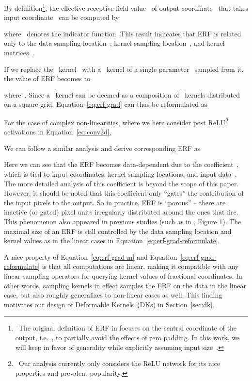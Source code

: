 \documentclass{article} \usepackage{iclr2020_conference, times}
\begin{document}
By definition\footnote{\
    The original definition of ERF in
    \cite{luo2016understanding} focuses on the central coordinate of the output,
    i.e.~, to partially avoid the effects of zero padding.
    In this work, we will keep  in favor of generality while explicitly
    assuming input size~.
}, the effective receptive field value~ of output coordinate~ that
takes input coordinate~ can be computed by

where~ denotes the indicator function. This result indicates
that ERF is related only to the data sampling location~, kernel sampling
location~, and kernel matrices~.

If we replace the~ kernel~ with a~
kernel of a single parameter~ sampled from it, the
value of ERF becomes to

where~. Since a~ kernel can be deemed
as a composition of~  kernels distributed on a square
grid, Equation~\ref{eq:erf-grad} can thus be reformulated as

For the case of complex non-linearities, where we here consider post ReLU\footnote{\
    Our analysis currently only considers the ReLU network for its
    nice properties and prevalent popularity.
} activations in
Equation~\ref{eq:conv2d},

We can follow a similar analysis and derive corresponding ERF as

Here we can see that the ERF becomes data-dependent due to the coefficient~,
which is tied to input coordinates, kernel sampling locations, and input
data~.
The more detailed analysis of this coefficient is beyond the scope of
this paper.
However, it should be noted that this coefficient only ``gates'' the
contribution of the input pixels to the output.
So in practice, ERF is ``porous'' -- there are inactive (or gated) pixel units
irregularly distributed around the ones that fire.
This phenomenon also appeared in previous studies (such as in
\citet{luo2016understanding}, Figure 1).
The maximal size of an ERF is still controlled by the data sampling location and
kernel values as in the linear cases in Equation~\ref{eq:erf-grad-reformulate}.

A nice property of Equation~\ref{eq:erf-grad-m} and
Equation~\ref{eq:erf-grad-reformulate} is that all computations are
linear, making it compatible with any linear sampling operators for querying
kernel values of fractional coordinates.
In other words, sampling kernels in effect samples the ERF on the data in the
linear case, but also roughly generalizes to non-linear cases as well.
This finding motivates our design of Deformable Kernels~(DKs) in
Section~\ref{sec:dk}.
\end{document}
